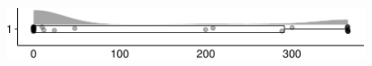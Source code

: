 \documentclass[
]{article}
\begin{document}
\begin{minipage}[t]{0.3\linewidth}

~

\end{minipage}%
\begin{minipage}[t]{0.7\linewidth}

\includegraphics[width=396px]{codebook_template_files/figure-latex/q7_37_rainplot-1}

\end{minipage}
 \vspace*{-5mm} 

\begin{minipage}[t]{0.3\linewidth}

~

\end{minipage}%
\begin{minipage}[t]{0.7\linewidth}

~

\end{minipage}
 \vspace*{-7mm} 
\end{document}
